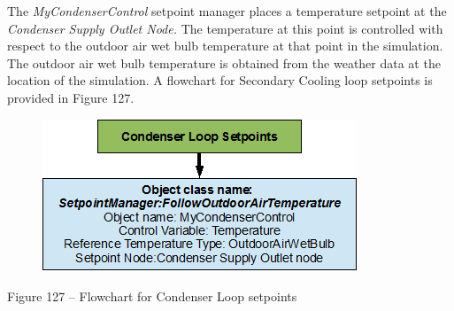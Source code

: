 The \emph{MyCondenserControl} setpoint manager places a temperature setpoint at the \emph{Condenser Supply Outlet Node.} The temperature at this point is controlled with respect to the outdoor air wet bulb temperature at that point in the simulation. The outdoor air wet bulb temperature is obtained from the weather data at the location of the simulation. A flowchart for Secondary Cooling loop setpoints is provided in Figure 127.

\begin{figure}[htbp]
\centering
\includegraphics{media/image127.png}
\caption{}
\end{figure}

Figure 127 -- Flowchart for Condenser Loop setpoints
